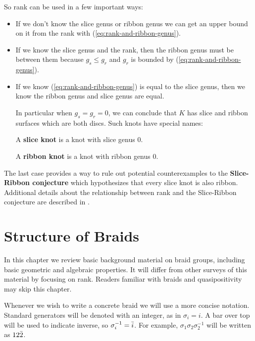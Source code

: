 \documentclass[12pt]{thesis}
\begin{document}
So rank can be used in a few important ways:
\begin{itemize}
    \item If we don't know the slice genus or ribbon genus
          we can get an upper bound on it from the rank
          with (\ref{eq:rank-and-ribbon-genus}).

    \item If we know the slice genus and the rank,
          then the ribbon genus must be between them
          because $g_{s} \leq g_{r}$ and $g_{r}$
          is bounded by (\ref{eq:rank-and-ribbon-genus}).

      \item If we know (\ref{eq:rank-and-ribbon-genus}) 
          is equal to the slice genus,
          then we know the ribbon genus and slice genus are equal.

          In particular when $g_{s} = g_{r} = 0$,
          we can conclude that $K$ has slice
          and ribbon surfaces which are both discs.
          Such knots have special names:
          \begin{definition}
              A \textbf{slice knot} is a knot with slice genus 0.
          \end{definition}
          \begin{definition}
              A \textbf{ribbon knot} is a knot with ribbon genus 0.
          \end{definition}
\end{itemize}

The last case provides a way
to rule out potential counterexamples to the \textbf{Slice-Ribbon conjecture}
which hypothesizes that every slice knot is also ribbon.
Additional details about the relationship between
rank and the Slice-Ribbon conjecture are described in \cite{on-braided-surfaces}.

\chapter{Structure of Braids}

\label{chap:structure}

In this chapter we review basic background material on braid groups,
including basic geometric and algebraic properties.
It will differ from other surveys of this material
by focusing on rank.
Readers familiar with braids and quasipositivity may skip this chapter.

Whenever we wish to write a concrete braid
we will use a more concise notation.
Standard generators will be denoted with an integer, as in $\sigma_{i} = i$.
A bar over top will be used to indicate inverse, so $\sigma_{i}^{-1} = \bar{i}$.
For example, $\sigma_{1}\sigma_{2}\sigma_{2}^{-1}$ will be written as
$12\bar{2}$.
\end{document}

